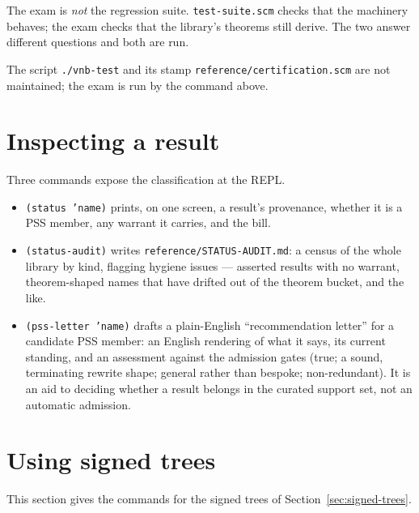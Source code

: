 \begin{remark}
The exam is \emph{not} the regression suite.  \texttt{test-suite.scm}
checks that the machinery behaves; the exam checks that the library's
theorems still derive.  The two answer different questions and both are
run.
\end{remark}

\begin{remark}
The script \texttt{./vnb-test} and its stamp
\nolinkurl{reference/certification.scm} are not maintained; the exam is
run by the command above.
\end{remark}

\section{Inspecting a result}
\label{sec:status-query}

Three commands expose the classification at the REPL.

\begin{itemize}
\item \texttt{(status 'name)} prints, on one screen, a result's
  provenance, whether it is a PSS member, any warrant it carries, and the
  bill.

\item \texttt{(status-audit)} writes \texttt{reference/STATUS-AUDIT.md}: a
  census of the whole library by kind, flagging hygiene issues --- asserted
  results with no warrant, theorem-shaped names that have drifted out of
  the theorem bucket, and the like.

\item \texttt{(pss-letter 'name)} drafts a plain-English ``recommendation
  letter'' for a candidate PSS member: an English rendering of what it
  says, its current standing, and an assessment against the admission
  gates (true; a sound, terminating rewrite shape; general rather than
  bespoke; non-redundant).  It is an aid to deciding whether a result
  belongs in the curated support set, not an automatic admission.
\end{itemize}


\section{Using signed trees}
\label{sec:signed-trees-use}

This section gives the commands for the signed trees of
Section~\ref{sec:signed-trees}.

